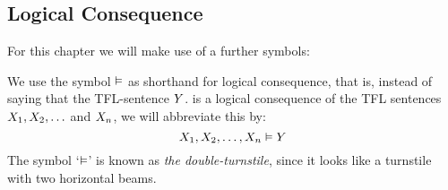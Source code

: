 \subsection{Logical Consequence}
For this chapter we will make use of a further symbols:
%

\label{doubleTurnstile}
We use the symbol $\vDash$ as shorthand for logical consequence, that is, instead of saying that the TFL-sentence $Y$.
is a logical consequence of the TFL sentences $X_1, X_2, \ldots$ and $X_n$, we will abbreviate this by:
$$X_1, X_2, \ldots, X_n \vDash Y$$
The symbol `$\vDash$' is known as \emph{the double-turnstile}, since it looks like a turnstile with two horizontal beams.

